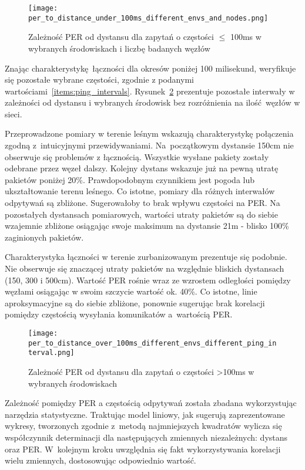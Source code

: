 \begin{figure}[!htb]
	\centering \texttt{[image: per\_to\_distance\_under\_100ms\_different\_envs\_and\_nodes.png]}
	\caption{Zależność \gls{PER} od dystansu dla zapytań o częstości $\leqslant$ 100ms w wybranych środowiskach i liczbę badanych węzłów}
	\label{rys:per_to_distance_under_100ms_different_envs_and_nodes}
\end{figure}

Znając charakterystykę łączności dla okresów poniżej 100 milisekund, weryfikuje się pozostałe wybrane częstości, zgodnie
z podanymi wartościami~\ref{items:ping_intervals}. Rysunek~\ref{rys:per_to_distance_over_100ms_different_envs_different_ping_interval}
prezentuje pozostałe interwały w zależności od dystansu i wybranych środowisk bez rozróżnienia na ilość węzłów w sieci.

Przeprowadzone pomiary w terenie leśnym wskazują charakterystykę połączenia zgodną z~intuicyjnymi przewidywaniami.
Na~początkowym dystansie 150cm nie obserwuje się problemów z łącznością. Wszystkie wysłane pakiety zostały
odebrane przez węzeł dalszy. Kolejny dystans wskazuje już na pewną utratę pakietów poniżej 20\%. Prawdopodobnym czynnikiem
jest pogoda lub ukształtowanie terenu leśnego. Co istotne, pomiary dla różnych interwałów odpytywań są zbliżone.
Sugerowałoby to brak wpływu częstości na \gls{PER}. Na pozostałych dystansach pomiarowych, wartości utraty pakietów
są do siebie wzajemnie zbliżone osiągając swoje maksimum na dystansie 21m - blisko 100\% zaginionych pakietów.

Charakterystyka łączności w terenie zurbanizowanym prezentuje się podobnie. Nie obserwuje się znaczącej utraty 
pakietów na względnie bliskich dystansach (150, 300 i 500cm). Wartość PER rośnie wraz ze wzrostem odległości
pomiędzy węzłami osiągając w swoim szczycie wartość ok. 40\%. Co istotne, linie aproksymacyjne są do siebie
zbliżone, ponownie sugerując brak korelacji pomiędzy częstością wysyłania komunikatów a~wartością PER.


\begin{figure}[!htb]
	\centering \texttt{[image: per\_to\_distance\_over\_100ms\_different\_envs\_different\_ping\_interval.png]} 
	\caption{Zależność \gls{PER} od dystansu dla zapytań o częstości >100ms w wybranych środowiskach}
	\label{rys:per_to_distance_over_100ms_different_envs_different_ping_interval}
\end{figure}

Zależność pomiędzy PER a częstością odpytywań została zbadana wykorzystując narzędzia statystyczne. Traktując model
liniowy, jak sugerują zaprezentowane wykresy, tworzonych zgodnie z~metodą najmniejszych kwadratów wylicza się 
współczynnik determinacji dla następujących zmiennych niezależnych: dystans oraz PER. W~kolejnym kroku uwzględnia
się fakt wykorzystywania korelacji wielu zmiennych, dostosowując odpowiednio wartość.


